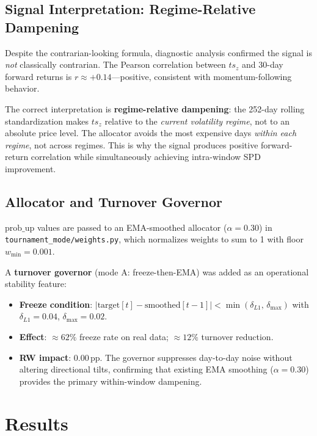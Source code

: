 \documentclass[11pt,letterpaper]{article}
\begin{document}
\subsection{Signal Interpretation: Regime-Relative Dampening}

Despite the contrarian-looking formula, diagnostic analysis confirmed the signal
is \emph{not} classically contrarian.  The Pearson correlation between $ts_z$ and
30-day forward returns is $r \approx +0.14$---positive, consistent with
momentum-following behavior.

The correct interpretation is \textbf{regime-relative dampening}: the 252-day
rolling standardization makes $ts_z$ relative to the \emph{current volatility
regime}, not to an absolute price level.  The allocator avoids the most expensive
days \emph{within each regime}, not across regimes.  This is why the signal
produces positive forward-return correlation while simultaneously achieving
intra-window SPD improvement.

\subsection{Allocator and Turnover Governor}

$\text{prob\_up}$ values are passed to an EMA-smoothed allocator
($\alpha = 0.30$) in \texttt{tournament\_mode/weights.py}, which normalizes
weights to sum to 1 with floor $w_{\min} = 0.001$.

A \textbf{turnover governor} (mode A: freeze-then-EMA) was added as an
operational stability feature:
\begin{itemize}
  \item \textbf{Freeze condition}: $|\text{target}[t] - \text{smoothed}[t-1]|
    < \min(\delta_{L1},\, \delta_{\max})$ with $\delta_{L1} = 0.04$,
    $\delta_{\max} = 0.02$.
  \item \textbf{Effect}: $\approx 62\%$ freeze rate on real data;
    $\approx 12\%$ turnover reduction.
  \item \textbf{RW impact}: $\mathbf{0.00}$\,pp.  The governor suppresses
    day-to-day noise without altering directional tilts, confirming that existing
    EMA smoothing ($\alpha=0.30$) provides the primary within-window dampening.
\end{itemize}

\section{Results}
\label{sec:results}
\end{document}
